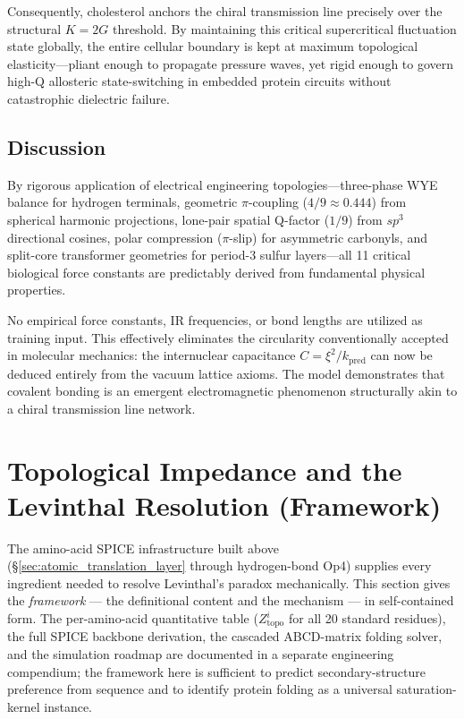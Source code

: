 Consequently, cholesterol anchors the chiral transmission line precisely over the structural $K=2G$ threshold. By maintaining this critical supercritical fluctuation state globally, the entire cellular boundary is kept at maximum topological elasticity---pliant enough to propagate pressure waves, yet rigid enough to govern high-Q allosteric state-switching in embedded protein circuits without catastrophic dielectric failure.

\subsection{Discussion}

By rigorous application of electrical engineering topologies---three-phase WYE balance for hydrogen terminals, geometric $\pi$-coupling ($4/9 \approx 0.444$) from spherical harmonic projections, lone-pair spatial Q-factor ($1/9$) from $sp^3$ directional cosines, polar compression ($\pi$-slip) for asymmetric carbonyls, and split-core transformer geometries for period-3 sulfur layers---all 11 critical biological force constants are predictably derived from fundamental physical properties.

No empirical force constants, IR frequencies, or bond lengths are utilized as training input. This effectively eliminates the circularity conventionally accepted in molecular mechanics: the internuclear capacitance $C = \xi^2/k_\text{pred}$ can now be deduced entirely from the vacuum lattice axioms. The model demonstrates that covalent bonding is an emergent electromagnetic phenomenon structurally akin to a chiral transmission line network.

\section{Topological Impedance and the Levinthal Resolution (Framework)}
\label{sec:z_topo_framework}

The amino-acid SPICE infrastructure built above (\S\ref{sec:atomic_translation_layer} through hydrogen-bond Op4) supplies every ingredient needed to resolve Levinthal's paradox mechanically. This section gives the \emph{framework} --- the definitional content and the mechanism --- in self-contained form. The per-amino-acid quantitative table ($Z_{\text{topo}}^i$ for all 20 standard residues), the full SPICE backbone derivation, the cascaded ABCD-matrix folding solver, and the simulation roadmap are documented in a separate engineering compendium; the framework here is sufficient to predict secondary-structure preference from sequence and to identify protein folding as a universal saturation-kernel instance.

